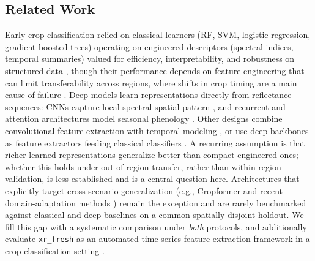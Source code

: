 \documentclass[preprint,authoryear]{elsarticle}
\begin{document}
\subsection{Related Work}
Early crop classification relied on classical learners (RF, SVM, logistic regression, gradient-boosted trees) operating on engineered descriptors (spectral indices, temporal summaries) valued for efficiency, interpretability, and robustness on structured data \citep{maxwell2019, belgiu2016, breiman2001, chen2016, ke2017}, though their performance depends on feature engineering that can limit transferability across regions, where shifts in crop timing are a main cause of failure \citep{nyborg2022timematch, hoppe2024}. Deep models learn representations directly from reflectance sequences: CNNs capture local spectral-spatial pattern \citep{cnn_multitemp}, and recurrent and attention architectures model seasonal phenology \citep{ieee2017, russwurm2018, ltae2020, russwurm2020}. Other designs combine convolutional feature extraction with temporal modeling \citep{tufail2025cnnrnn}, or use deep backbones as feature extractors feeding classical classifiers \citep{yang2020}. A recurring assumption is that richer learned representations generalize better than compact engineered ones; whether this holds under out-of-region transfer, rather than within-region validation, is less established and is a central question here. Architectures that explicitly target cross-scenario generalization (e.g., Cropformer and recent domain-adaptation methods \citep{cropformer2023, li2025classaware, wang2025climate}) remain the exception and are rarely benchmarked against classical and deep baselines on a common spatially disjoint holdout. We fill this gap with a systematic comparison under \emph{both} protocols, and additionally evaluate \texttt{xr\_fresh} as an automated time-series feature-extraction framework in a crop-classification setting \citep{mann2025}.
\end{document}
